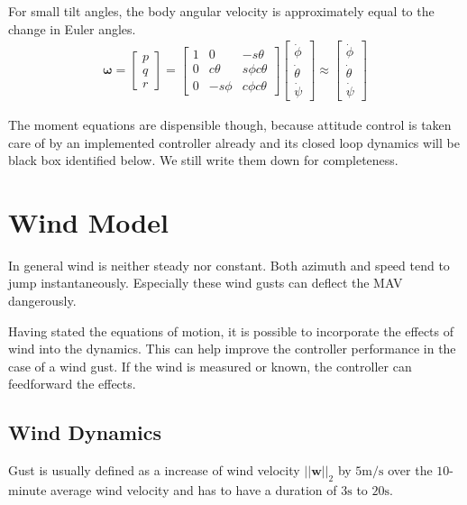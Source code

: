 For small tilt angles, the body angular velocity is approximately equal to the change in Euler angles.
\begin{align}
\boldsymbol{\omega} = \begin{bmatrix}
p \\ q \\ r
\end{bmatrix} = \begin{bmatrix}
1 & 0 & -s\theta \\
0 & c\theta & s\phi c\theta \\
0 & -s\phi & c\phi c\theta
\end{bmatrix} \begin{bmatrix}
\dot\phi \\ \dot\theta \\ \dot\psi
\end{bmatrix} \approx \begin{bmatrix}
\dot\phi \\ \dot\theta \\ \dot\psi
\end{bmatrix}
\end{align}


The moment equations are dispensible though, because attitude control is taken care of by an implemented controller already and its closed loop dynamics will be black box identified below. We still write them down for completeness.

\section{Wind Model}
\label{sec:wind_model}
In general wind is neither steady nor constant. Both azimuth and speed tend to jump instantaneously. Especially these wind gusts can deflect the MAV dangerously.

Having stated the equations of motion, it is possible to incorporate the effects of wind into the dynamics. This can help improve the controller performance in the case of a wind gust. If the wind is measured or known, the controller can feedforward the effects.

\subsection{Wind Dynamics}
Gust is usually defined as a increase of wind velocity $||\mathbf{w}||_2$ by $5\si{\metre\per\second}$ over the $10$-minute average wind velocity and has to have a duration of $3 \si{\second}$ to $20 \si{\second}$.

